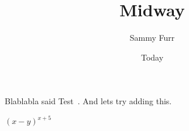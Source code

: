 \message{ !name(midway.tex)}\documentclass[11pt]{article}
\begin{document}


\title{Midway}
\author{Sammy Furr}
\date{Today}
\maketitle

Blablabla said Test~\cite{DBLP:journals/corr/OCallahanJFHNP17}.
And lets try adding this.

$(x-y)^{x+5}$

{}

\end{document}
